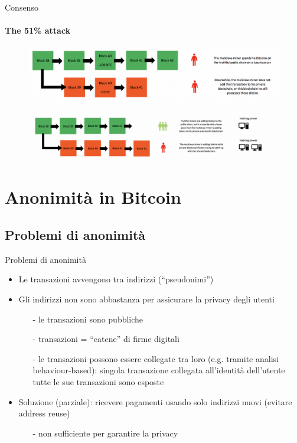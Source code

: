 \documentclass{beamer}
\begin{document}
  
  
  \begin{frame}{Consenso}
  \framesubtitle{The 51\% attack}
      \begin{figure}
          \centering
          \includegraphics[width=1\linewidth]{../img/attack_1.png}
      \end{figure}
      \begin{figure}
          \centering
          \includegraphics[width=1\linewidth]{../img/attack_2.png}
      \end{figure}
  \end{frame}
  
  
  
  \section{Anonimità in Bitcoin}
  \subsection{Problemi di anonimità}
  \begin{frame}{Problemi di anonimità}
      \begin{itemize}
          \item Le transazioni avvengono tra indirizzi (``pseudonimi'')
          \item Gli indirizzi non sono abbastanza per assicurare la privacy degli utenti
          \begin{itemize}
              \item[-] le transazioni sono pubbliche 
              \item[-] transazioni = ``catene'' di firme digitali
              \item[-] le transazioni possono essere collegate tra loro (e.g. tramite analisi behaviour-based): singola transazione collegata all'identità dell'utente \MVRightarrow\, tutte le sue transazioni sono esposte
          \end{itemize}
          \item Soluzione (parziale): ricevere pagamenti usando solo indirizzi nuovi (evitare address reuse) 
          \begin{itemize}
              \item[-] non sufficiente per garantire la privacy  
          \end{itemize}
      \end{itemize}
  \end{frame}
  
\end{document}
